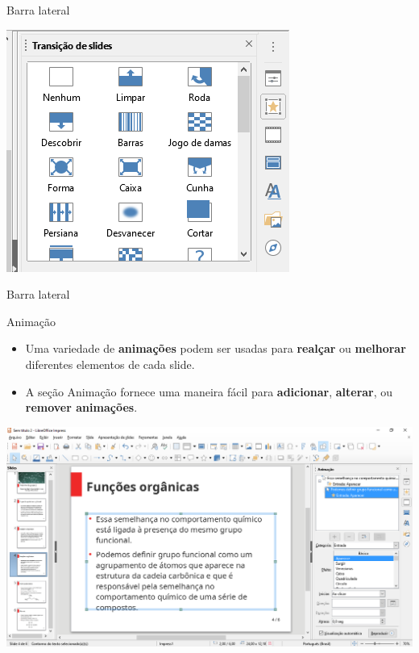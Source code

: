 \begin{frame}{Barra lateral}

	\centering
	\includegraphics[width=0.75\linewidth]{Figuras/Ch05/fig10}
\end{frame}


\begin{frame}{Barra lateral}
	\begin{block}{Animação}
		\begin{itemize}
			\item Uma variedade de \textbf{animações} podem ser usadas para \textbf{realçar} ou \textbf{melhorar} diferentes elementos de cada slide.
			\item A seção Animação fornece uma maneira fácil para \textbf{adicionar}, \textbf{alterar}, ou \textbf{remover animações}.
		\end{itemize}
	\end{block}

	\centering
	\includegraphics[width=0.75\linewidth]{Figuras/Ch05/fig11}
\end{frame}


